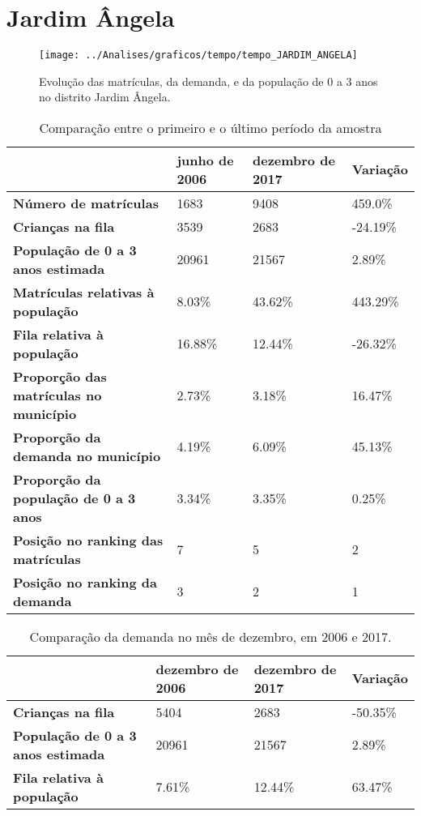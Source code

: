 \section{Jardim Ângela}
\begin{figure}[H]
\centering
\texttt{[image: ../Analises/graficos/tempo/tempo\_JARDIM\_ANGELA]}
\caption{Evolução das matrículas, da demanda, e da população de 0 a 3 anos no distrito Jardim Ângela.}
\end{figure}
\begin{table}[H]
\begin{tabular}{|l|l|l|l|}
\hline
\textbf{}                                      & \textbf{junho de 2006}       & \textbf{dezembro de 2017}    & \textbf{Variação} \\ \hline
\textbf{Número de matrículas}                  & 1683 & 9408 & 459.0\% \\ \hline
\textbf{Crianças na fila}                      & 3539 & 2683 & -24.19\% \\ \hline
\textbf{População de 0 a 3 anos estimada}      & 20961 & 21567 & 2.89\% \\ \hline
\textbf{Matrículas relativas à população}      & 8.03\% & 43.62\% & 443.29\% \\ \hline
\textbf{Fila relativa à população}             & 16.88\% & 12.44\% & -26.32\% \\ \hline
\textbf{Proporção das matrículas no município} & 2.73\% & 3.18\% & 16.47\% \\ \hline
\textbf{Proporção da demanda no município}     & 4.19\% & 6.09\% & 45.13\% \\ \hline
\textbf{Proporção da população de 0 a 3 anos}  & 3.34\% & 3.35\% & 0.25\% \\ \hline
\textbf{Posição no ranking das matrículas}     & 7 & 5 & 2 \\ \hline
\textbf{Posição no ranking da demanda}         & 3 & 2 & 1 \\ \hline
\end{tabular}
\caption{Comparação entre o primeiro e o último período da amostra}
\end{table}
\begin{table}[H]
\begin{tabular}{|l|l|l|l|}
\hline
\textbf{}                                 & \textbf{dezembro de 2006} & \textbf{dezembro de 2017} & \textbf{Variação} \\ \hline
\textbf{Crianças na fila}                      & 5404 & 2683 & -50.35\% \\ \hline
\textbf{População de 0 a 3 anos estimada}      & 20961 & 21567 & 2.89\% \\ \hline
\textbf{Fila relativa à população}             & 7.61\% & 12.44\% & 63.47\% \\ \hline
\end{tabular}
\caption{Comparação da demanda no mês de dezembro, em 2006 e 2017.}
\end{table}
